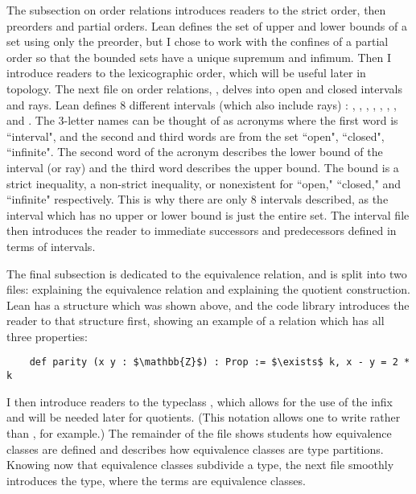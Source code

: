 The subsection on order relations introduces readers to the strict order, then preorders
and partial orders. Lean defines the set of upper and lower bounds of a set using only 
the preorder, but I chose to work with the confines of a partial order so that the 
bounded sets have a unique supremum and infimum. Then I introduce readers to the lexicographic
order, which will be useful later in topology. The next file on order relations, , delves into 
open and closed intervals and rays. Lean defines 8 different intervals (which also include rays) : 
, , , , , , , and .
The 3-letter names can be thought of as acronyms where the first word is ``interval", and the 
second and third words are from the set {``open", ``closed", ``infinite"}. The second word of the 
acronym describes the lower bound of the interval (or ray) and the third word describes the 
upper bound. The bound is a strict inequality, a non-strict inequality, or nonexistent for
``open," ``closed," and ``infinite" respectively. This is why there are only 8 intervals described, 
as the interval which has no upper or lower bound is just the entire set. The interval file then
introduces the reader to immediate successors and predecessors defined in terms of intervals.

The final subsection is dedicated to the equivalence relation, and is split into two files: 
 explaining the equivalence relation and
 explaining the quotient construction.
Lean has a structure  which was shown above, and the code library
introduces the reader to that structure first, showing an example of a relation
which has all three properties: 
\begin{lstlisting}
    def parity (x y : $\mathbb{Z}$) : Prop := $\exists$ k, x - y = 2 * k
\end{lstlisting}
I then introduce readers to the typeclass , which allows for the
use of the infix \lean{$\approx$} and will be needed later for quotients. 
(This notation allows one to write  rather than 
, for example.) The remainder of the file shows students how 
equivalence classes are defined and describes how equivalence classes are
type partitions. Knowing now that equivalence classes subdivide a type, 
the next file smoothly introduces the  type, 
where the terms are equivalence classes.

